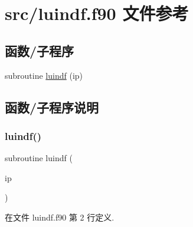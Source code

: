 \hypertarget{luindf_8f90}{}\section{src/luindf.f90 文件参考}
\label{luindf_8f90}
\subsection*{函数/子程序}
\begin{DoxyCompactItemize}
\item 
subroutine \mbox{\hyperlink{luindf_8f90_a28d65e7ed933fdebd163a15f0118a285}{luindf}} (ip)
\end{DoxyCompactItemize}


\subsection{函数/子程序说明}
\mbox{\label{luindf_8f90_a28d65e7ed933fdebd163a15f0118a285}} 
\subsubsection{\texorpdfstring{luindf()}{luindf()}}
{\footnotesize\ttfamily subroutine luindf (\begin{DoxyParamCaption}\item[{}]{ip }\end{DoxyParamCaption})}



在文件 luindf.\+f90 第 2 行定义.

